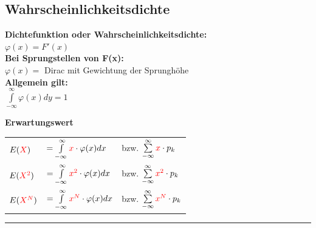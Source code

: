 \subsection{Wahrscheinlichkeitsdichte }
\begin{multicols}{2}
\textbf{Dichtefunktion oder Wahrscheinlichkeitsdichte:} \\
$\varphi(x) = F'(x)$ \\
\textbf{Bei Sprungstellen von F(x):} \\
$\varphi(x) = $ Dirac mit Gewichtung der Sprunghöhe\\
\textbf{Allgemein gilt:}\\
$\int\limits_{-\infty}^{\infty}\varphi (x) dy = 1$

\columnbreak

	\textbf{Erwartungswert} \\
	\begin{tabular}{l l l}
		$E(\textcolor{red}{X})$ &  
    $ = \int\limits_{-\infty}^{\infty} \textcolor{red}{x} \cdot \varphi(x) dx$  & 
    bzw. $\sum\limits_{-\infty}^{\infty} \textcolor{red}{x} \cdot p_k$\\
    
		$E(\textcolor{red}{X^2})$ & 
    $ = \int\limits_{-\infty}^{\infty} \textcolor{red}{x^2} \cdot \varphi(x) dx$ & 
    bzw. $\sum\limits_{-\infty}^{\infty} \textcolor{red}{x^2} \cdot p_k$\\
    
		$E(\textcolor{red}{X^N})$ & 
    $ = \int\limits_{-\infty}^{\infty} \textcolor{red}{x^N} \cdot \varphi(x) dx$ 
    & bzw. $\sum\limits_{-\infty}^{\infty} \textcolor{red}{x^N} \cdot p_k$
	\end{tabular}
\end{multicols}

\hrule

